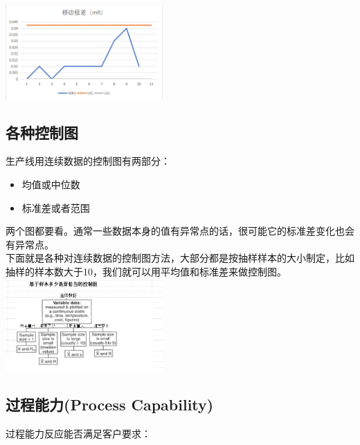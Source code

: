 \includegraphics[width=6cm]{微信截图_20210927084434.png}

\hypertarget{ux5404ux79cdux63a7ux5236ux56fe}{%
\subsection{各种控制图}\label{ux5404ux79cdux63a7ux5236ux56fe}}

生产线用连续数据的控制图有两部分：

\begin{itemize}
\tightlist
\item
  均值或中位数
\item
  标准差或者范围
\end{itemize}

两个图都要看。通常一些数据本身的值有异常点的话，很可能它的标准差变化也会有异常点。\\
下面就是各种对连续数据的控制图方法，大部分都是按抽样样本的大小制定，比如抽样的样本数大于10，我们就可以用平均值和标准差来做控制图。\\


\includegraphics[width=6cm]{微信截图_20231026155739.png}

\hypertarget{ux8fc7ux7a0bux80fdux529bprocess-capability-1}{%
\subsection{过程能力(Process
Capability)}\label{ux8fc7ux7a0bux80fdux529bprocess-capability-1}}

过程能力反应能否满足客户要求：\\


